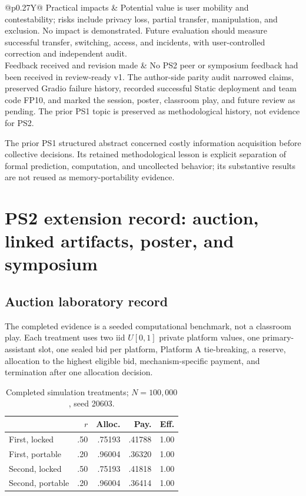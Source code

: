 \begin{table}[H]
\begin{tabularx}{\textwidth}{@{}p{}Y@{}}
Practical impacts & Potential value is user mobility and contestability; risks include privacy loss, partial transfer, manipulation, and exclusion. No impact is demonstrated. Future evaluation should measure successful transfer, switching, access, and incidents, with user-controlled correction and independent audit. \\
Feedback received and revision made & No PS2 peer or symposium feedback had been received in review-ready v1. The author-side parity audit narrowed claims, preserved Gradio failure history, recorded successful Static deployment and team code FP10, and marked the session, poster, classroom play, and future review as pending. The prior PS1 topic is preserved as methodological history, not evidence for PS2. \\
\bottomrule
\end{tabularx}
\end{table}
\noindent The prior PS1 structured abstract concerned costly information acquisition before collective decisions. Its retained methodological lesson is explicit separation of formal prediction, computation, and uncollected behavior; its substantive results are not reused as memory-portability evidence.

\clearpage\twocolumn
\section{PS2 extension record: auction, linked artifacts, poster, and symposium}
\subsection{Auction laboratory record}
The completed evidence is a seeded computational benchmark, not a classroom play. Each treatment uses two iid $U[0,1]$ private platform values, one primary-assistant slot, one sealed bid per platform, Platform A tie-breaking, a reserve, allocation to the highest eligible bid, mechanism-specific payment, and termination after one allocation decision.

\begin{table}[h]
\caption{Completed simulation treatments; $N=100{,}000$, seed 20603.}
\begin{tabularx}{\columnwidth}{@{}p{1.15cm}rrrr@{}}\toprule
&\textbf{$r$}&\textbf{Alloc.}&\textbf{Pay.}&\textbf{Eff.}\\\midrule
First, locked&.50&.75193&.41788&1.00\\
First, portable&.20&.96004&.36320&1.00\\
Second, locked&.50&.75193&.41818&1.00\\
Second, portable&.20&.96004&.36414&1.00\\\bottomrule
\end{tabularx}
\end{table}

